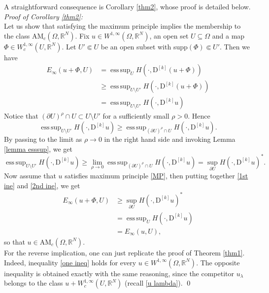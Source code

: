 \documentclass[a4paper,11pt]{article}
\numberwithin{equation}{section}
\newcommand{\numberset}{\mathbb}
\newcommand{\Om}{\Omega}
\newcommand{\R}{\numberset{R}}
\DeclareMathOperator*{\esssup}{ess\,sup}
\theoremstyle{definition}
\begin{document}
A straightforward consequence is Corollary \ref{thm2}, whose proof is detailed below.\\

\textit{Proof of Corollary \ref{thm2}:}\\
Let us show that satisfying the maximum principle implies the membership to the class $ \mathrm {AM}_c(\Om,\R^N)$. Fix $u\in W^{1,\infty}(\Om,\R^N)$, an open set $U\subseteq\Om$ and a map $\Phi\in W^{1,\infty}_c(U,\R^N)$. Let $U'\Subset U$ be an open subset with supp$(\Phi)\Subset U'$. Then we have
\begin{equation}\label{1st ine}
\begin{aligned}
E_\infty(u+\Phi,U)&=\esssup_U H(\cdot, \mathrm D^{[k]}(u+\Phi))\\
&\geq \esssup_{U\setminus U'}H(\cdot, \mathrm D^{[k]}(u+\Phi))\\
&=\esssup_{U\setminus U'}H(\cdot, \mathrm D^{[k]}u)
\end{aligned}
\end{equation}
Notice that $(\partial U)^\rho\cap U\subset U\setminus U'$ for a sufficiently small $\rho>0$. Hence
$$
\esssup_{U\setminus U'}H(\cdot, \mathrm D^{[k]}u)\geq \esssup_{(\partial U)^\rho\cap U}H(\cdot, \mathrm D^{[k]}u).
$$
By passing to the limit as $\rho\to 0$ in the right hand side and invoking Lemma \ref{lemma esssup}, we get
\begin{equation}\label{2nd ine}
\esssup_{U\setminus U'}H(\cdot, \mathrm D^{[k]}u)\geq \lim_{\rho\to0}\esssup_{(\partial U)^\rho\cap U}H(\cdot, \mathrm D^{[k]}u)=\sup_{\partial U}H(\cdot, \mathrm D^{[k]}u)^*.
\end{equation}
Now assume that $u$ satisfies maximum principle \eqref{MP}, then putting together \eqref{1st ine} and \eqref{2nd ine}, we get
\begin{align*}
E_\infty(u+\Phi,U)&\geq\sup_{\partial U}H(\cdot, \mathrm D^{[k]}u)^*\\
&=\esssup_{U}H(\cdot, \mathrm D^{[k]}u)\\
&=E_\infty(u,U),
\end{align*}
so that $u\in \mathrm{AM}_c(\Om,\R^N)$.\\
For the reverse implication, one can just replicate the proof of Theorem \ref{thm1}. Indeed, inequality \eqref{one ineq} holds for every $u\in W^{1,\infty}(\Om,\R^N)$. The opposite inequality is obtained exactly with the same reasoning, since the competitor $u_\lambda$ belongs to the class $u+W^{1,\infty}_c(U,\R^N)$ (recall \eqref{u lambda}).
\qed
\end{document}
